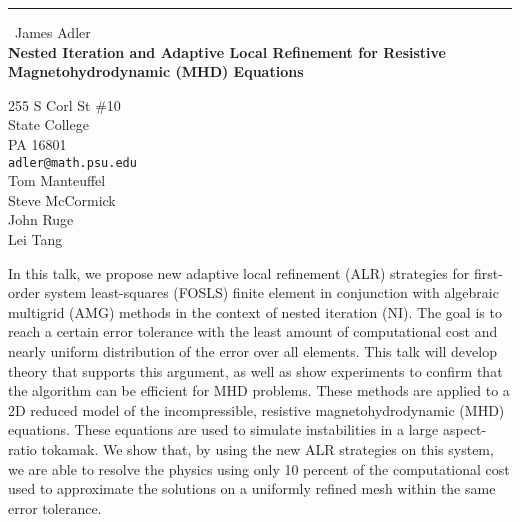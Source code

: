 \documentclass{report}
\begin{document}
\begin{center}
\rule{6in}{1pt} \
{\large James Adler \\
{\bf Nested Iteration and Adaptive Local Refinement for Resistive Magnetohydrodynamic (MHD) Equations}}

255 S Corl St \#10 \\ State College \\ PA 16801
\\
{\tt adler@math.psu.edu}\\
Tom Manteuffel\\
Steve McCormick\\
John Ruge\\
Lei Tang\end{center}

In this talk, we propose new adaptive local refinement (ALR) strategies
for first-order system least-squares (FOSLS) finite element in
conjunction with algebraic multigrid (AMG) methods in the context of
nested iteration (NI). The goal is to reach a certain error tolerance
with the least amount of computational cost and nearly uniform
distribution of the error over all elements. This talk will develop
theory that supports this argument, as well as show experiments to
confirm that the algorithm can be efficient for MHD problems. These
methods are applied to a 2D reduced model of the incompressible,
resistive magnetohydrodynamic (MHD) equations. These equations are used
to simulate instabilities in a large aspect-ratio tokamak. We show that,
by using the new ALR strategies on this system, we are able to resolve
the physics using only 10 percent of the computational cost used to
approximate the solutions on a uniformly refined mesh within the same
error tolerance.
\end{document}
